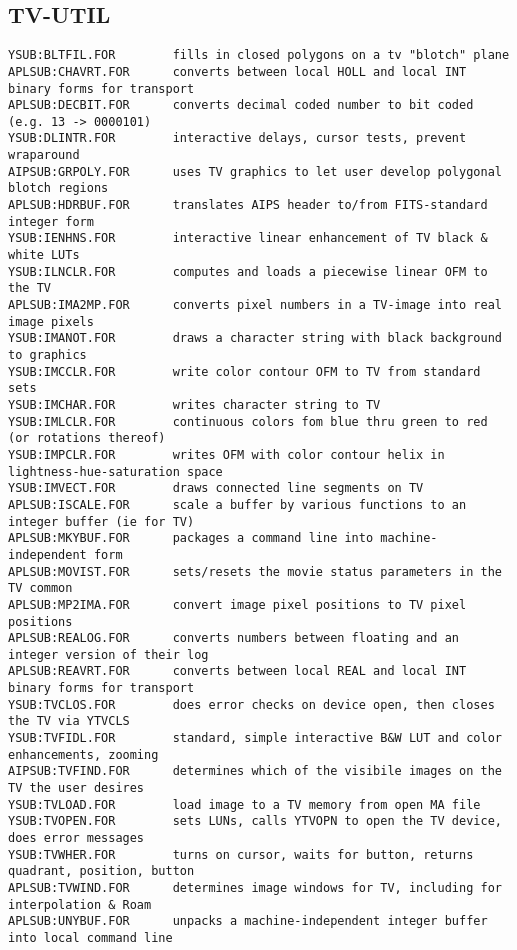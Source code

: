 \subsection{TV-UTIL}
\begin{verbatim}
YSUB:BLTFIL.FOR        fills in closed polygons on a tv "blotch" plane
APLSUB:CHAVRT.FOR      converts between local HOLL and local INT binary forms for transport
APLSUB:DECBIT.FOR      converts decimal coded number to bit coded (e.g. 13 -> 0000101)
YSUB:DLINTR.FOR        interactive delays, cursor tests, prevent wraparound
AIPSUB:GRPOLY.FOR      uses TV graphics to let user develop polygonal blotch regions
APLSUB:HDRBUF.FOR      translates AIPS header to/from FITS-standard integer form
YSUB:IENHNS.FOR        interactive linear enhancement of TV black & white LUTs
YSUB:ILNCLR.FOR        computes and loads a piecewise linear OFM to the TV
APLSUB:IMA2MP.FOR      converts pixel numbers in a TV-image into real image pixels
YSUB:IMANOT.FOR        draws a character string with black background to graphics
YSUB:IMCCLR.FOR        write color contour OFM to TV from standard sets
YSUB:IMCHAR.FOR        writes character string to TV
YSUB:IMLCLR.FOR        continuous colors fom blue thru green to red (or rotations thereof)
YSUB:IMPCLR.FOR        writes OFM with color contour helix in lightness-hue-saturation space
YSUB:IMVECT.FOR        draws connected line segments on TV
APLSUB:ISCALE.FOR      scale a buffer by various functions to an integer buffer (ie for TV)
APLSUB:MKYBUF.FOR      packages a command line into machine-independent form
APLSUB:MOVIST.FOR      sets/resets the movie status parameters in the TV common
APLSUB:MP2IMA.FOR      convert image pixel positions to TV pixel positions
APLSUB:REALOG.FOR      converts numbers between floating and an integer version of their log
APLSUB:REAVRT.FOR      converts between local REAL and local INT binary forms for transport
YSUB:TVCLOS.FOR        does error checks on device open, then closes the TV via YTVCLS
YSUB:TVFIDL.FOR        standard, simple interactive B&W LUT and color enhancements, zooming
AIPSUB:TVFIND.FOR      determines which of the visibile images on the TV the user desires
YSUB:TVLOAD.FOR        load image to a TV memory from open MA file
YSUB:TVOPEN.FOR        sets LUNs, calls YTVOPN to open the TV device, does error messages
YSUB:TVWHER.FOR        turns on cursor, waits for button, returns quadrant, position, button
APLSUB:TVWIND.FOR      determines image windows for TV, including for interpolation & Roam
APLSUB:UNYBUF.FOR      unpacks a machine-independent integer buffer into local command line

\end{verbatim}
